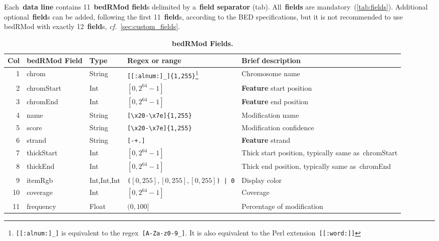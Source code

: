 \documentclass[11pt]{article}
\begin{document}
Each~\textbf{data line} contains 11~\textbf{\acs{bedRMod} field}s delimited by a~\textbf{field separator} (tab).
All~\textbf{fields} are mandatory~(\autoref{tab:fields}).
Additional optional~\textbf{field}s can be added, following the first 11~\textbf{field}s, according to the \acs{BED} specifications, but 
it is not recommended to use \acs{bedRMod} with exactly 12~\textbf{field}s, \textit{cf.}~\autoref{sec:custom_fields}.

\begin{savenotes}
  \begin{table}
    \begin{adjustwidth}{-0.5in}{-0.5in}
      \begin{tabularx}{\linewidth}{r l l l L}
        \toprule
        Col & \acs{bedRMod} Field & Type & Regex or range & Brief description \\
        & \textsf{chrom}
        & String
        & \texttt{[[:alnum:]\_]\{1,255\}}\footnote{\texttt{[[:alnum:]\_]} is equivalent to the \ac{regex}~\texttt{[A-Za-z0-9\_]}. %
        It is also equivalent to the Perl extension~\texttt{[[:word:]]}}
        & Chromosome name \\
        2 & \textsf{chromStart} & Int & $[0, 2^{64}-1]$ & \textbf{Feature} start position \\
        3 & \textsf{chromEnd} & Int & $[0, 2^{64} -1]$ & \textbf{Feature} end position \\
        4 
        & \textsf{name} 
        & String 
        & \texttt{[{\textbackslash}x20-{\textbackslash}x7e]\{1,255\}} 
        & Modification name \\
        5 & \textsf{score} & String & \texttt{[{\textbackslash}x20-{\textbackslash}x7e]\{1,255\}} & Modification confidence \\
        6 & \textsf{strand} & String & \texttt{[-+.]} & \textbf{Feature} strand \\
        7 & \textsf{thickStart} & Int & $[0, 2^{64}-1]$ & Thick start position, typically same as~\textsf{chromStart} \\
        8 & \textsf{thickEnd} & Int & $[0, 2^{64}-1]$ & Thick end position, typically same as~\textsf{chromEnd} \\
        9 & \textsf{itemRgb} & Int,Int,Int & \texttt{(}$[0, 255], [0,255], [0,255]$\texttt{) | 0} & Display color \\ %
        10 & \textsf{coverage} & Int &  $[0, 2^{64}-1]$ & Coverage \\
        11 & \textsf{frequency} & Float & $(0, 100]$ & Percentage of modification \\
        \bottomrule
      \end{tabularx}
    \end{adjustwidth}
    \caption{\textbf{\acs{bedRMod} Fields.}}\label{tab:fields}
  \end{table}
\end{savenotes}
\end{document}
